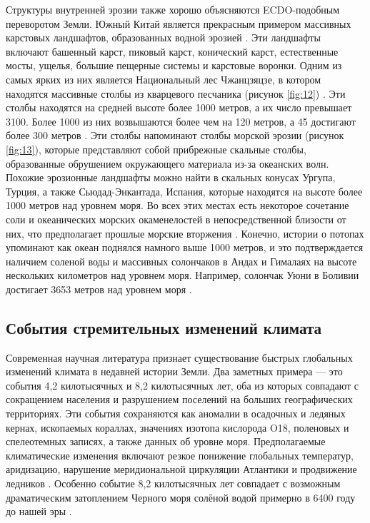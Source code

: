 \documentclass[10pt,twocolumn,letterpaper]{article}
\begin{document}
Структуры внутренней эрозии также хорошо объясняются ECDO-подобным переворотом Земли. Южный Китай является прекрасным примером массивных карстовых ландшафтов, образованных водной эрозией \cite{82}. Эти ландшафты включают башенный карст, пиковый карст, конический карст, естественные мосты, ущелья, большие пещерные системы и карстовые воронки. Одним из самых ярких из них является Национальный лес Чжанцзяцзе, в котором находятся массивные столбы из кварцевого песчаника (рисунок \ref{fig:12}) \cite{84}. Эти столбы находятся на средней высоте более 1000 метров, а их число превышает 3100. Более 1000 из них возвышаются более чем на 120 метров, а 45 достигают более 300 метров \cite{85}. Эти столбы напоминают столбы морской эрозии (рисунок \ref{fig:13}), которые представляют собой прибрежные скальные столбы, образованные обрушением окружающего материала из-за океанских волн. Похожие эрозионные ландшафты можно найти в скальных конусах Ургупа, Турция, а также Сьюдад-Энкантада, Испания, которые находятся на высоте более 1000 метров над уровнем моря. Во всех этих местах есть некоторое сочетание соли и океанических морских окаменелостей в непосредственной близости от них, что предполагает прошлые морские вторжения \cite{15,86,87}. Конечно, истории о потопах \cite{3} упоминают как океан поднялся намного выше 1000 метров, и это подтверждается наличием соленой воды и массивных солончаков в Андах и Гималаях на высоте нескольких километров над уровнем моря. Например, солончак Уюни в Боливии достигает 3653 метров над уровнем моря \cite{94}.

\subsection{События стремительных изменений климата}

Современная научная литература признает существование быстрых глобальных изменений климата в недавней истории Земли. Два заметных примера — это события 4,2 килотысячных и 8,2 килотысячных лет, оба из которых совпадают с сокращением населения и разрушением поселений на больших географических территориях. Эти события сохраняются как аномалии в осадочных и ледяных кернах, ископаемых кораллах, значениях изотопа кислорода O18, поленовых и спелеотемных записях, а также данных об уровне моря. Предполагаемые климатические изменения  включают резкое понижение глобальных температур, аридизацию, нарушение меридиональной циркуляции Атлантики и продвижение ледников \cite{90,91,92}. Особенно событие 8,2 килотысячных лет совпадает с возможным драматическим затоплением Черного моря солёной водой примерно в 6400 году до нашей эры \cite{93}.
\end{document}
